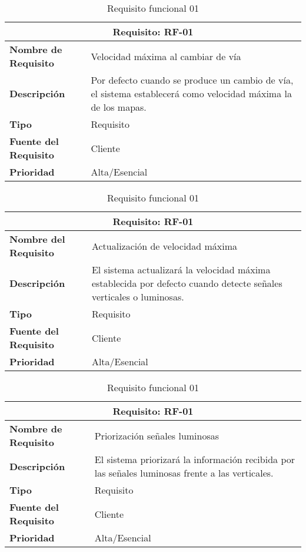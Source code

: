 \begin{table}[H]
\begin{center}
\begin{tabular}{p{} p{7cm}}
\multicolumn{2}{c}{\textbf{Requisito: RF-01} } \\
\hline \hline
\textbf{Nombre de Requisito} & Velocidad máxima al cambiar de vía  \\
\hline
\textbf{Descripción} & Por defecto cuando se produce un cambio de vía, el sistema establecerá como velocidad máxima la de los mapas.\\
\hline
\textbf{Tipo} & Requisito \\
\hline
\textbf{Fuente del Requisito} & Cliente \\
\hline
\textbf{Prioridad} & Alta/Esencial \\ \hline
\end{tabular}
\caption{Requisito funcional 01}
\label{tab:personal}
\end{center}
\end{table}

\begin{table}[H]
\begin{center}
\begin{tabular}{p{} p{7cm}}
\multicolumn{2}{c}{\textbf{Requisito: RF-01} } \\
\hline \hline
\textbf{Nombre del Requisito} & Actualización de velocidad máxima \\
\hline
\textbf{Descripción} & El sistema actualizará la velocidad máxima establecida por defecto cuando detecte señales verticales o luminosas. \\
\hline
\textbf{Tipo} & Requisito \\
\hline
\textbf{Fuente del Requisito} & Cliente \\
\hline
\textbf{Prioridad} & Alta/Esencial \\ \hline
\end{tabular}
\caption{Requisito funcional 01}
\label{tab:personal}
\end{center}
\end{table}

\begin{table}[H]
\begin{center}
\begin{tabular}{p{} p{7cm}}
\multicolumn{2}{c}{\textbf{Requisito: RF-01} } \\
\hline \hline
\textbf{Nombre de Requisito} & Priorización señales luminosas \\
\hline
\textbf{Descripción} & El sistema priorizará la información recibida por las señales luminosas frente a las verticales. \\
\hline
\textbf{Tipo} & Requisito \\
\hline
\textbf{Fuente del Requisito} & Cliente \\
\hline
\textbf{Prioridad} & Alta/Esencial \\ \hline
\end{tabular}
\caption{Requisito funcional 01}
\label{tab:personal}
\end{center}
\end{table}

